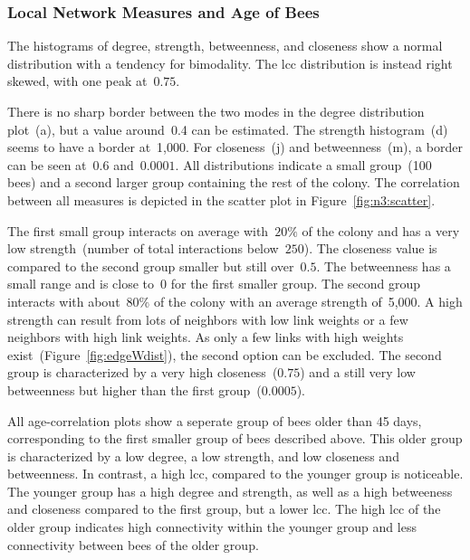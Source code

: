 \subsubsection{Local Network Measures and Age of Bees}
The histograms of degree, strength, betweenness, and closeness show a normal distribution with a tendency for bimodality. The lcc distribution is instead right skewed, with one peak at~$0.75$.

There is no sharp border between the two modes in the degree distribution plot~(a), but a value around~0.4 can be estimated.
The strength histogram~(d) seems to have a border at~1,000.
For closeness~(j) and betweenness~(m), a border can be seen at~$0.6$ and~$0.0001$.
All distributions indicate a small group~(100 bees) and a second larger group containing the rest of the colony.
The correlation between all measures is depicted in the scatter plot in Figure~\ref{fig:n3:scatter}.  

The first small group interacts on average with~$20\%$ of the colony and has a very low strength~(number of total interactions below~$250$).
The closeness value is compared to the second group smaller but still over~$0.5$.
The betweenness has a small range and is close to~$0$ for the first smaller group.
The second group interacts with about~$80\%$ of the colony with an average strength of~5,000.
A high strength can result from lots of neighbors with low link weights or a few neighbors with high link weights.
As only a few links with high weights exist~(Figure~\ref{fig:edgeWdist}), the second option can be excluded. The second group is characterized by a very high closeness~($0.75$) and a still very low betweenness but higher than the first group~($0.0005$).

All age-correlation plots show a seperate group of bees older than 45 days, corresponding to the first smaller group of bees described above.
This older group is characterized by a low degree, a low strength, and low closeness and betweenness.
In contrast, a high lcc, compared to the younger group is noticeable.
The younger group has a high degree and strength, as well as a high betweeness and closeness compared to the first group, but a lower lcc.
The high lcc of the older group indicates high connectivity within the younger group and less connectivity between bees of the older group.

